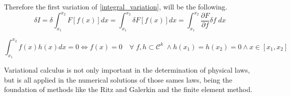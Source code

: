 Therefore the first variation of \eqref{integral_variation}, will be the following.
\begin{equation}
\delta I = \delta \int_{x_1}^{x_2}F[f(x)]dx= \int_{x_1}^{x_2} \delta F[f(x)]dx= \int_{x_1}^{x_2} \dfrac{\partial F}{\partial f}\delta f \; dx
\end{equation}

\begin{teo}
\begin{equation}
\int_{x_1}^{x_2} f(x)h(x) dx = 0 \Leftrightarrow f(x)=0 \quad \forall \; f,h \subset \mathcal{C}^k \; \land h(x_1)=h(x_2)=0 \land x \in [x_1,x_2]  
\label{ftv}
\end{equation}
\end{teo}
Variational calculus is not only important in the determination of physical laws, but is all applied in the numerical solutions of those sames laws, being the foundation of  methods like the Ritz and Galerkin and the finite element method. 





